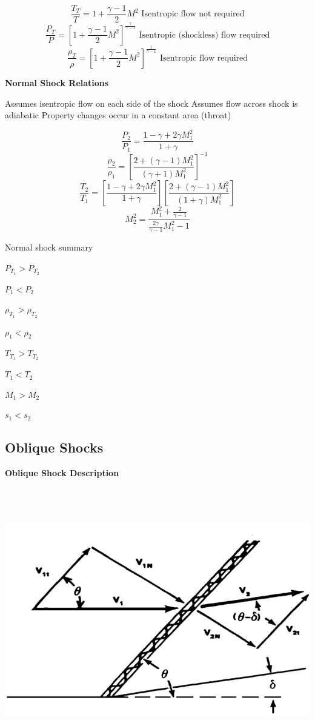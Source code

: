 \documentclass[
]{book}
\begin{document}
\[\frac{T_T}{T} = 1 + \frac{\gamma -1}{2}M^2 \text{   Isentropic flow not required}\]
\[\frac{P_T}{P} = \left[1 + \frac{\gamma - 1}{2}M^2 \right]^{\frac{\gamma}{\gamma-1}} \text{   Isentropic (shockless) flow required}\]
\[\frac{\rho_T}{\rho} = \left[1 + \frac{\gamma - 1}{2} M^2 \right]^{\frac{1}{\gamma -1}} \text{   Isentropic flow required} \]

\textbf{Normal Shock Relations}

Assumes isentropic flow on each side of the shock
Assumes flow across shock is adiabatic
Property changes occur in a constant area (throat)

\[\frac{P_2}{P_1} = \frac{1 - \gamma + 2\gamma M_1^2}{1+\gamma} \]
\[\frac{\rho_2}{\rho_1} = \left[\frac{2 + \left(\gamma - 1\right) M_1^2}{\left(\gamma+1\right) M_1^2} \right]^{-1} \]
\[\frac{T_2}{T_1} = \left[\frac{1 - \gamma + 2\gamma M_1^2}{1 + \gamma} \right]\left[\frac{2 + \left(\gamma - 1\right) M_1^2}{\left(1 + \gamma\right) M_1^2} \right] \]
\[M_2^2 = \frac{M_1^2 + \frac{2}{\gamma - 1}}{\frac{2\gamma}{\gamma-1} M_1^2-1} \]

Normal shock summary

\(P_{T_1} > P_{T_2}\)

\(P_{1} < P_{2}\)

\(\rho_{T_1} > \rho_{T_2}\)

\(\rho_{1} < \rho_{2}\)

\(T_{T_1} > T_{T_2}\)

\(T_{1} < T_{2}\)

\(M_1 > M_2\)

\(s_1 < s_2\)

\hypertarget{oblique-shocks}{%
\subsection{Oblique Shocks}\label{oblique-shocks}}

\textbf{Oblique Shock Description}

\includegraphics[width=7.124in,height=4.5in]{media/05/image59.png}
\end{document}
